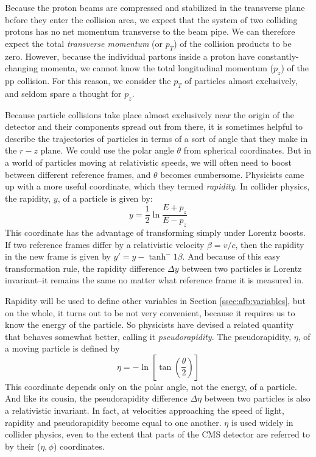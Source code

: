 Because the proton beams are compressed and stabilized in the
transverse plane before they enter the collision area, we expect
that the system of two colliding protons has no net momentum
transverse to the beam pipe. We can therefore expect the total
\emph{transverse momentum} (or $p_T$) of the collision products to be
zero. However, because the individual partons inside a proton have
constantly-changing momenta, we cannot know the total longitudinal
momentum ($p_z$) of the pp collision. For
this reason, we consider the $p_T$ of particles almost exclusively,
and seldom spare a thought for $p_z$.

Because particle collisions take place almost exclusively near the
origin of the detector and their components spread out from there, it
is sometimes helpful to describe the trajectories of particles in terms of
a sort of angle that they make in the $r-z$ plane. We could use the
polar angle $\theta$ from spherical coordinates. But in a world of
particles moving at relativistic speeds, we will often need to boost
between different reference frames, and $\theta$ becomes
cumbersome. Physicists came up with a more useful coordinate, which
they termed \emph{rapidity}. In collider physics, the rapidity, $y$,
of a particle is given by:
\begin{equation}
\label{eq:cms:rapidity}
y = \frac{1}{2} \ln \frac{E+p_z}{E-p_z}
\end{equation}
This coordinate has the advantage of transforming simply under Lorentz
boosts. If two reference frames differ by a relativistic velocity
$\beta = v/c$, then the rapidity in the new frame is given by $y\prime
= y - \tanh^-1 \beta$. And because of this easy transformation rule,
the rapidity difference $\Delta y$ between two particles is Lorentz
invariant--it remains the same no matter what reference frame it is
measured in.

Rapidity will be used to define other variables in Section
\ref{ssec:afb:variables}, but on the whole, it turns out to be not
very convenient, because it requires us to know the energy of the
particle. So physicists have devised a related quantity that behaves
somewhat better, calling it \emph{pseudorapidity}. The pseudorapidity,
$\eta$, of a moving particle is defined by
\begin{equation}
\label{eq:cms:eta}
\eta = -\ln \left[ \tan \left( \frac{\theta}{2} \right) \right]
\end{equation}
This coordinate depends only on the polar angle, not the energy, of a
particle. And like its cousin, the pseudorapidity difference $\Delta\eta$
between two particles is also a relativistic invariant. In fact, at
velocities approaching the speed of light, rapidity and pseudorapidity
become equal to one another. $\eta$ is used widely in collider
physics, even to the extent that parts of the CMS detector are
referred to by their ($\eta, \phi$) coordinates.

